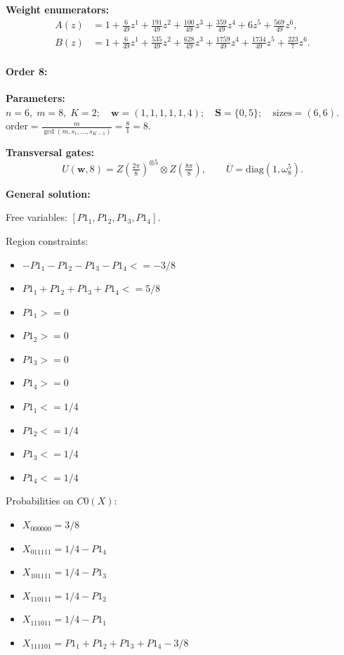 \documentclass[11pt]{article}
\begin{document}
\noindent\textbf{Weight enumerators:}
\begin{align*}
A(z) &= 1 + \tfrac{6}{49}z^{1} + \tfrac{191}{49}z^{2} + \tfrac{100}{49}z^{3} + \tfrac{359}{49}z^{4} + 6z^{5} + \tfrac{569}{49}z^{6},\\[2pt]
B(z) &= 1 + \tfrac{6}{49}z^{1} + \tfrac{535}{49}z^{2} + \tfrac{628}{49}z^{3} + \tfrac{1759}{49}z^{4} + \tfrac{1734}{49}z^{5} + \tfrac{223}{7}z^{6}.
\end{align*}

\paragraph{\textbf{Order 8:}}
\noindent\textbf{Parameters:} $n=6,\; m=8,\; K=2;\quad \mathbf w=(1, 1, 1, 1, 1, 4);\quad \mathbf S=\{0, 5\};\quad \text{sizes}=\left(6, 6\right).$ $\displaystyle \text{order}=\frac{m}{\gcd(m,s_1,\dots,s_{K-1})}=\frac{8}{1}=8.$

\noindent\textbf{Transversal gates:}
\[
    U(\mathbf w,8)=Z \left(\tfrac{2\pi}{8}\right)^{\otimes5} \otimes Z \left(\tfrac{8\pi}{8}\right) ,\qquad
    \overline U=\mathrm{diag}(1,\omega_{8}^{5}).
\]

\noindent\textbf{General solution:}

Free variables: $[P1_1, P1_2, P1_3, P1_4]$.

Region constraints:
\begin{itemize}
    \item $-P1_1 - P1_2 - P1_3 - P1_4 <= -3/8$
    \item $P1_1 + P1_2 + P1_3 + P1_4 <= 5/8$
    \item $P1_1 >= 0$
    \item $P1_2 >= 0$
    \item $P1_3 >= 0$
    \item $P1_4 >= 0$
    \item $P1_1 <= 1/4$
    \item $P1_2 <= 1/4$
    \item $P1_3 <= 1/4$
    \item $P1_4 <= 1/4$
\end{itemize}

Probabilities on $C0 (X)$:
\begin{itemize}
    \item $X_{000000} = 3/8$
    \item $X_{011111} = 1/4 - P1_4$
    \item $X_{101111} = 1/4 - P1_3$
    \item $X_{110111} = 1/4 - P1_2$
    \item $X_{111011} = 1/4 - P1_1$
    \item $X_{111101} = P1_1 + P1_2 + P1_3 + P1_4 - 3/8$
\end{itemize}
\end{document}
